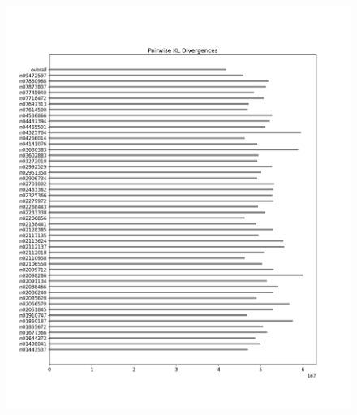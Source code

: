 \documentclass{article}
\begin{document}
\begin{figure}[H]
\begin{minipage}{0.45\textwidth}
            \includegraphics[width=\textwidth]{cross_imagenet_imgr_r_second_last_untrained/alexnet_kl_div_a_to_bpairwise.png} %
            

\end{minipage}
\end{figure}
\end{document}
